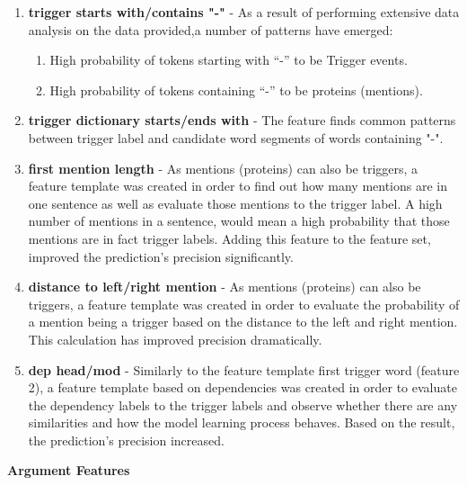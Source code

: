 \documentclass{article} %
\begin{document}
\begin{enumerate}
\item \textbf {trigger starts with/contains "-"} - 
As a result of performing extensive data analysis on the data provided,a number of patterns have emerged:
\begin{enumerate}
\item High probability of tokens starting with “-” to be Trigger events.
\item High probability of tokens containing “-” to be proteins (mentions).
\end{enumerate}

\item \textbf{trigger dictionary starts/ends with} - The feature finds common patterns between trigger label and candidate word segments of words containing "-".

\item \textbf{first mention length} - As mentions (proteins) can also be triggers, a feature template was created in order to find out how many mentions are in one sentence as well as evaluate those mentions to the trigger label. A high number of mentions in a sentence, would mean a high probability that those mentions are in fact trigger labels. Adding this feature to the feature set, improved the prediction’s precision significantly.

\item \textbf{distance to left/right mention} - As mentions (proteins) can also be triggers, a feature template was created in order to evaluate the probability of a mention being a trigger based on the distance to the left and right mention. This calculation has improved precision dramatically.

\item \textbf{dep head/mod} - Similarly to the feature template first trigger word (feature 2), a feature template based on dependencies was created in order to evaluate the dependency labels to the trigger labels and observe whether there are any similarities and how the model learning process behaves. Based on the result, the prediction’s precision increased.
\end{enumerate}

\textbf{Argument Features}\
\end{document}
